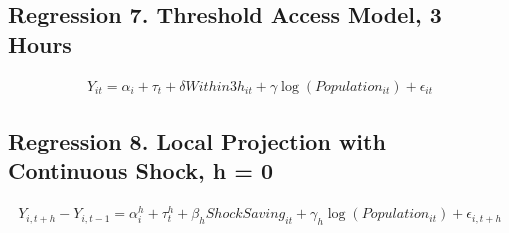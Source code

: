 \documentclass[a4paper, 10pt]{article}
\begin{document}
\begin{table}[H]
\centering
\caption{Regression 7. Threshold Access Model, 2.5 Hours: 의사}

\end{table}

\subsection{Regression 7. Threshold Access Model, 3 Hours}
\begin{align*}
    Y_{it}=\alpha_i+\tau_t+\delta Within3h_{it}+\gamma\log(Population_{it})+\epsilon_{it}
\end{align*}
\begin{table}[H]
\centering
\caption{Regression 7. Threshold Access Model, 3 Hours: 의원}

\end{table}

\begin{table}[H]
\centering
\caption{Regression 7. Threshold Access Model, 3 Hours: 병원}

\end{table}

\begin{table}[H]
\centering
\caption{Regression 7. Threshold Access Model, 3 Hours: 종합병원}

\end{table}

\begin{table}[H]
\centering
\caption{Regression 7. Threshold Access Model, 3 Hours: 상급종합병원}

\end{table}

\begin{table}[H]
\centering
\caption{Regression 7. Threshold Access Model, 3 Hours: 의사}

\end{table}

\subsection{Regression 8. Local Projection with Continuous Shock, h = 0}
\begin{align*}
    Y_{i,t+h}-Y_{i,t-1}=\alpha_i^h+\tau_t^h+\beta_h ShockSaving_{it}+\gamma_h\log(Population_{it})+\epsilon_{i,t+h}
\end{align*}
\begin{table}[H]
\centering
\caption{Regression 8. Local Projection with Continuous Shock, h = 0: 의원}

\end{table}
\end{document}
